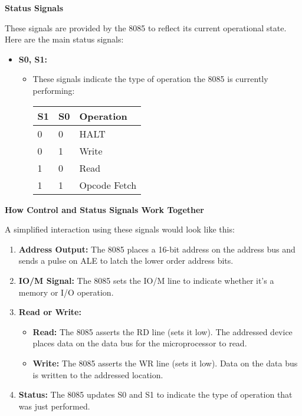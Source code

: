 \documentclass[
]{article}
\begin{document}
\textbf{Status Signals}

These signals are provided by the 8085 to reflect its current
operational state. Here are the main status signals:

\begin{itemize}
\item
  \textbf{S0, S1:}

  \begin{itemize}
  \item
    These signals indicate the type of operation the 8085 is currently
    performing:

    \begin{longtable}[]{@{}lll@{}}
    \toprule
    S1 & S0 & Operation \\
    \midrule
    \endhead
    0 & 0 & HALT \\
    0 & 1 & Write \\
    1 & 0 & Read \\
    1 & 1 & Opcode Fetch \\
    \bottomrule
    \end{longtable}
  \end{itemize}
\end{itemize}

\textbf{How Control and Status Signals Work Together}

A simplified interaction using these signals would look like this:

\begin{enumerate}
\def\labelenumi{\arabic{enumi}.}
\item
  \textbf{Address Output:} The 8085 places a 16-bit address on the
  address bus and sends a pulse on ALE to latch the lower order address
  bits.
\item
  \textbf{IO/M Signal:} The 8085 sets the IO/M line to indicate whether
  it's a memory or I/O operation.
\item
  \textbf{Read or Write:}

  \begin{itemize}
  \item
    \textbf{Read:} The 8085 asserts the RD line (sets it low). The
    addressed device places data on the data bus for the microprocessor
    to read.
  \item
    \textbf{Write:} The 8085 asserts the WR line (sets it low). Data on
    the data bus is written to the addressed location.
  \end{itemize}
\item
  \textbf{Status:} The 8085 updates S0 and S1 to indicate the type of
  operation that was just performed.
\end{enumerate}
\end{document}
